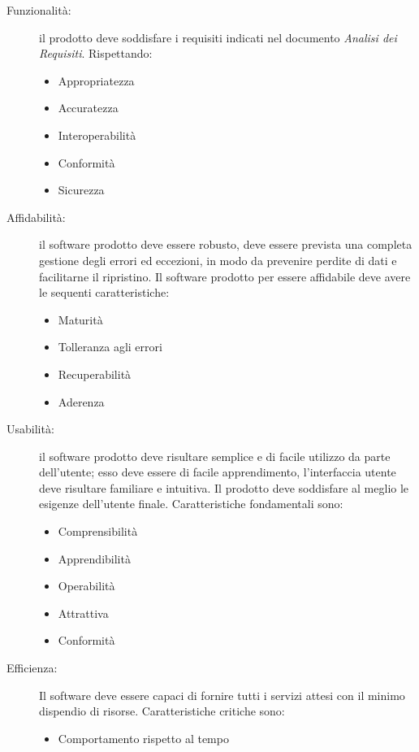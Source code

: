     \begin{description}
      \item [Funzionalità:] il prodotto deve soddisfare i requisiti indicati nel documento \emph{Analisi dei Requisiti}. Rispettando:
      \begin{itemize}
          \item Appropriatezza
          \item Accuratezza
          \item Interoperabilità
          \item Conformità
          \item Sicurezza
      \end{itemize}
      \item [Affidabilità:] il software prodotto deve essere robusto, deve essere prevista una completa gestione degli errori ed eccezioni,
       in modo da prevenire perdite di dati e facilitarne il ripristino. Il software prodotto per essere affidabile deve avere le sequenti caratteristiche:
       \begin{itemize}
         \item Maturità
         \item Tolleranza agli errori
         \item Recuperabilità
         \item Aderenza
       \end{itemize}
      \item [Usabilità:] il software prodotto deve risultare semplice e di facile utilizzo da parte dell'utente; esso deve essere di facile apprendimento,
      l'interfaccia utente deve risultare familiare e intuitiva. Il prodotto deve soddisfare al meglio le esigenze dell'utente finale. Caratteristiche fondamentali sono:
      \begin{itemize}
        \item Comprensibilità
        \item Apprendibilità
        \item Operabilità
        \item Attrattiva
        \item Conformità
      \end{itemize}
      \item [Efficienza:] Il software deve essere capaci di fornire tutti i servizi attesi con il minimo dispendio di risorse. Caratteristiche critiche sono:
      \begin{itemize}
        \item Comportamento rispetto al tempo

\end{itemize}
\end{description}
